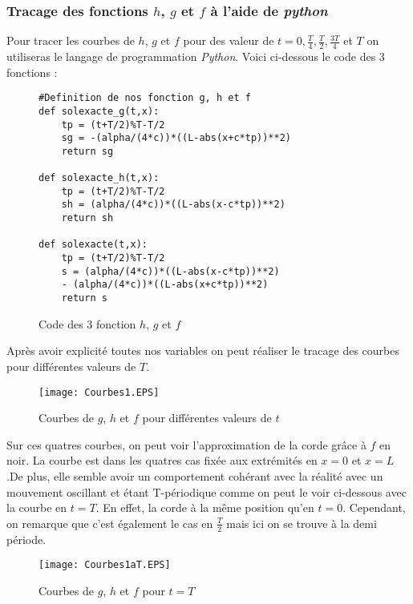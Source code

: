 \documentclass[12pt]{article}
\begin{document}
\subsubsection{Tracage des fonctions $h$, $g$ et $f$ à l'aide de \textit{python}}
Pour tracer les courbes de $h$, $g$ et $f$ pour des valeur de $t=0,\frac{T}{4},\frac{T}{2},\frac{3T}{4}$ et $T$ on utiliseras le langage de programmation \textit{Python}. Voici ci-dessous le code des 3 fonctions :

\begin{figure}[h]
\centering
\begin{minipage}{12cm} %
\begin{lstlisting}[style=stylepython]
#Definition de nos fonction g, h et f
def solexacte_g(t,x):
    tp = (t+T/2)%T-T/2
    sg = -(alpha/(4*c))*((L-abs(x+c*tp))**2)
    return sg

def solexacte_h(t,x):
    tp = (t+T/2)%T-T/2
    sh = (alpha/(4*c))*((L-abs(x-c*tp))**2)
    return sh

def solexacte(t,x):
    tp = (t+T/2)%T-T/2
    s = (alpha/(4*c))*((L-abs(x-c*tp))**2)
    - (alpha/(4*c))*((L-abs(x+c*tp))**2)
    return s

\end{lstlisting}
\end{minipage} %
\caption{Code des 3 fonction $h$, $g$ et $f$}
\end{figure}
Après avoir explicité toutes nos variables on peut réaliser le tracage des courbes pour différentes valeurs de $T$. \\

\begin{figure}[!h]
\centering
\texttt{[image: Courbes1.EPS]}\\
\caption{Courbes de $g$, $h$ et $f$ pour différentes valeurs de $t$}
\end{figure}

Sur ces quatres courbes, on peut voir l'approximation de la corde grâce à $f$ en noir. La courbe est dans les quatres cas fixée aux extrémités en $x=0$ et $x=L$.De plus, elle semble avoir un comportement cohérant avec la réalité avec un mouvement oscillant et étant T-périodique comme on peut le voir ci-dessous avec la courbe en $t=T$. En effet, la corde à la même position qu'en $t=0$. Cependant, on remarque que c'est également le cas en $\frac{T}{2}$ mais ici on se trouve à la demi période.

\begin{figure}[!h]
\centering
\texttt{[image: Courbes1aT.EPS]}\\
\caption{Courbes de $g$, $h$ et $f$ pour $t=T$}
\end{figure}
\end{document}
